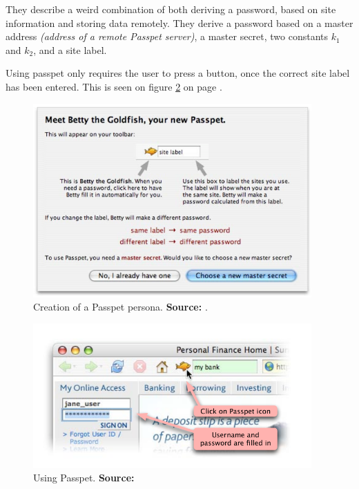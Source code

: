 			They describe a weird combination of both deriving a password, based on site information and storing data remotely. They derive a password based on a master address \emph{(address of a remote Passpet server)}, a master secret, two constants $k_1$ and $k_2$, and a site label.

			Using passpet only requires the user to press a button, once the correct site label has been entered. This is seen on figure \ref{fig:passpet_main} on page \pageref{fig:passpet_main}.


			\begin{figure}[htbp]
				\centering
				\includegraphics[width=0.95\textwidth]{figures/analysis/passpet_persona.png}
				\caption{Creation of a Passpet persona. \textbf{Source:} \cite[p.4]{passpet}.}
				\label{fig:passepet_persona}
			\end{figure}

			\begin{figure}[htbp]
				\centering
				\includegraphics[width=0.95\textwidth]{figures/analysis/passpet.png}
				\caption{Using Passpet. \textbf{Source:} \cite[p.1]{passpet}}
				\label{fig:passpet_main}
			\end{figure}

